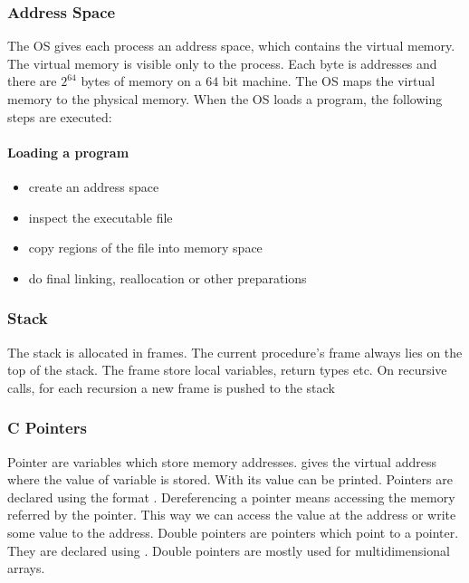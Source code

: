 

\subsubsection{Address Space}
The OS gives each process an address space, which contains the virtual memory. The virtual memory is visible only to the process. Each byte is addresses and there are $2^{64}$ bytes of memory on a $64$ bit machine. The OS maps the virtual memory to the physical memory.
When the OS loads a program, the following steps are executed:

\paragraph{Loading a program}
\begin{itemize}
    \item create an address space
    \item inspect the executable file
    \item copy regions of the file into memory space
    \item do final linking, reallocation or other preparations
\end{itemize}

\subsubsection{Stack}
The stack is allocated in frames. The current procedure's frame always lies on the top of the stack. The frame store local variables, return types etc. On recursive calls, for each recursion a new frame is pushed to the stack

\subsubsection{C Pointers}
Pointer are variables which store memory addresses.  gives the virtual address where the value of variable  is stored. With  its value can be printed. Pointers are declared using the format . Dereferencing a pointer means accessing the memory referred by the pointer. This way we can access the value at the address or write some value to the address. Double pointers are pointers which point to a pointer. They are declared using . Double pointers are mostly used for multidimensional arrays.

